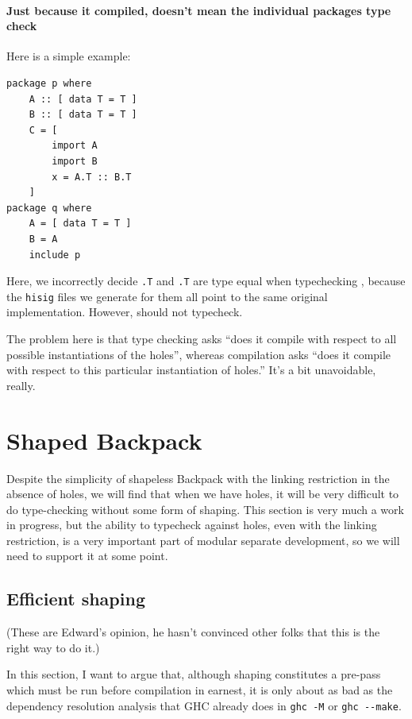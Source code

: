 \documentclass{article}
\begin{document}
\paragraph{Just because it compiled, doesn't mean the individual packages type check}
Here is a simple example:

\begin{verbatim}
package p where
    A :: [ data T = T ]
    B :: [ data T = T ]
    C = [
        import A
        import B
        x = A.T :: B.T
    ]
package q where
    A = [ data T = T ]
    B = A
    include p
\end{verbatim}

Here, we incorrectly decide \verb|.T| and \verb|.T| are type
equal when typechecking , because the \verb|hisig| files we
generate for them all point to the same original implementation.  However,
 should not typecheck.

The problem here is that type checking asks ``does it compile with respect
to all possible instantiations of the holes'', whereas compilation asks
``does it compile with respect to this particular instantiation of holes.''
It's a bit unavoidable, really.

\section{Shaped Backpack}

Despite the simplicity of shapeless Backpack with the linking
restriction in the absence of holes, we will find that when we have
holes, it will be very difficult to do type-checking without
some form of shaping.  This section is very much a work in progress,
but the ability to typecheck against holes, even with the linking restriction,
is a very important part of modular separate development, so we will need
to support it at some point.

\subsection{Efficient shaping}

(These are Edward's opinion, he hasn't convinced other folks that this is
the right way to do it.)

In this section, I want to argue that, although shaping constitutes
a pre-pass which must be run before compilation in earnest, it is only
about as bad as the dependency resolution analysis that GHC already does
in \verb|ghc -M| or \verb|ghc --make|.
\end{document}
